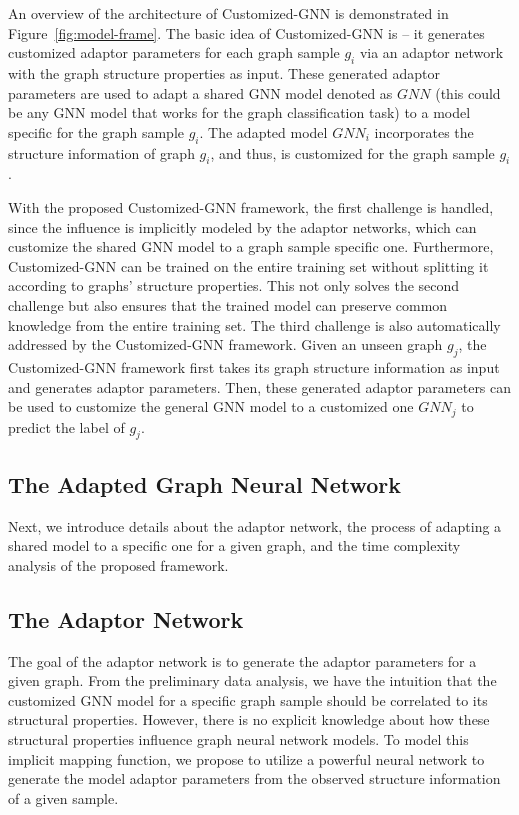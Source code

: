 \documentclass[11pt,dvipdfm]{article}
\begin{document}
An overview of the architecture of Customized-GNN is demonstrated in Figure~\ref{fig:model-frame}. The basic idea of Customized-GNN is -- it generates customized adaptor parameters for each graph sample $g_i$ via an adaptor network with the graph structure properties as input. These generated adaptor parameters are used to adapt a shared GNN model denoted as $GNN$ (this could be any GNN model that works for the graph classification task) to a model specific for the graph sample $g_i$. The adapted model $GNN_i$ incorporates the structure information of graph $g_i$, and thus, is customized for the graph sample $g_i$.

With the proposed Customized-GNN framework, the first challenge is handled, since the influence is implicitly modeled by the adaptor networks, which can customize the shared GNN model to a graph sample specific one. Furthermore, Customized-GNN can be trained on the entire training set without splitting it according to graphs' structure properties. This not only solves the second challenge but also ensures that the trained model can preserve common knowledge from the entire training set. The third challenge is also automatically addressed by the Customized-GNN framework. Given an unseen graph $g_j$, the Customized-GNN framework first takes its graph structure information as input and generates adaptor parameters. Then, these generated adaptor parameters can be used to customize the general GNN model to a customized one $GNN_j$ to predict the label of $g_j$. 


\subsection{ The Adapted Graph Neural Network}\label{the_adapted_model}



Next, we introduce details about the adaptor network, the process of adapting a shared model to a specific one for a given graph, and the time complexity analysis of the proposed framework. 



\subsection{The Adaptor Network}

The goal of the adaptor network is to generate the adaptor parameters for a given graph. From the preliminary data analysis, we have the intuition that the customized GNN model for a specific graph sample should be correlated to its structural properties. However, there is no explicit knowledge about how these structural properties influence graph neural network models. To model this implicit mapping function, we propose to utilize a powerful neural network to generate the model adaptor parameters from the observed structure information of a given sample.
\end{document}
